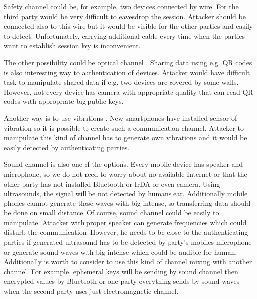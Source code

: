 \documentclass[11pt,titlepage]{article}
\theoremstyle{plain}
\begin{document}
\vspace{5mm}

Safety channel could be, for example, two devices connected by wire. For the third party would be very difficult to eavesdrop the session. Attacker should be connected also to this wire but it would be visible for the other parties and easily to detect. Unfortunately, carrying additional cable every time when the parties want to establish session key is inconvenient.

\vspace{5mm}

The other possibility could be optical channel \cite{QRcode}. Sharing data using e.g. QR codes is also interesting way to authentication of devices. Attacker would have difficult task to manipulate shared data if e.g. two devices are covered by some walls. However, not every device has camera with appropriate quality that can read QR codes with appropriate big public keys.

\vspace{5mm}

Another way is to use vibrations \cite{vibrat}. New smartphones have installed sensor of vibration so it is possible to create such a communication channel. Attacker to manipulate this kind of channel has to generate own vibrations and it would be easily detected by authenticating parties.

\vspace{5mm}

Sound channel is also one of the options. Every mobile device has speaker and microphone, so we do not need to worry about no available Internet or that the other party has not installed Bluetooth or IrDA or even camera. Using ultrasounds, the signal will be not detected by humans ear. Additionally mobile phones cannot generate these waves with big intense, so transferring data should be done on small distance. Of course, sound channel could be easily to manipulate. Attacker with proper speaker can generate frequencies which could disturb the communication. However, he needs to be close to the authenticating parties if generated ultrasound has to be detected by party's mobiles microphone or generate sound waves with big intense which could be audible for human. Additionally is worth to consider to use this kind of channel mixing with another channel. For example, ephemeral keys will be sending by sound channel then encrypted values by Bluetooth or one party everything sends by sound waves when the second party uses just electromagnetic channel.
\end{document}
